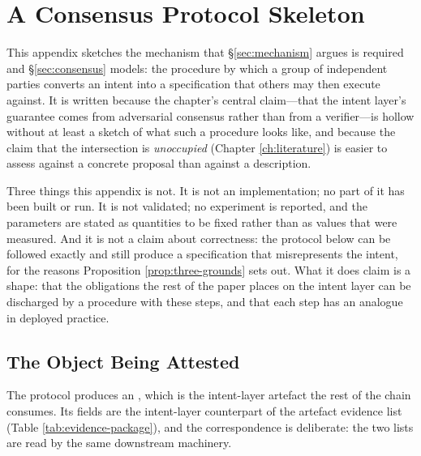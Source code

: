 \chapter{A Consensus Protocol Skeleton}\label{app:protocol}

This appendix sketches the mechanism that \S\ref{sec:mechanism} argues is required and
\S\ref{sec:consensus} models: the procedure by which a group of independent parties converts an
intent into a specification that others may then execute against. It is written because the
chapter's central claim---that the intent layer's guarantee comes from adversarial consensus rather
than from a verifier---is hollow without at least a sketch of what such a procedure looks like, and
because the claim that the intersection is \emph{unoccupied} (Chapter \ref{ch:literature}) is
easier to assess against a concrete proposal than against a description.

Three things this appendix is not. It is not an implementation; no part of it has been built or
run. It is not validated; no experiment is reported, and the parameters are stated as quantities to
be fixed rather than as values that were measured. And it is not a claim about correctness: the
protocol below can be followed exactly and still produce a specification that misrepresents the
intent, for the reasons Proposition \ref{prop:three-grounds} sets out. What it does claim is a
shape: that the obligations the rest of the paper places on the intent layer can be discharged by a
procedure with these steps, and that each step has an analogue in deployed practice.

\section{The Object Being Attested}

The protocol produces an , which is the intent-layer artefact the rest of
the chain consumes. Its fields are the intent-layer counterpart of the artefact evidence list
(Table \ref{tab:evidence-package}), and the correspondence is deliberate: the two lists are read by
the same downstream machinery.

